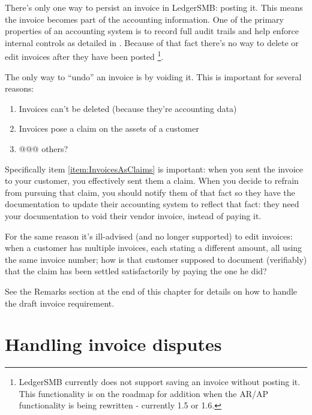 There's only one way to persist an invoice in LedgerSMB: posting it. This means
the invoice becomes part of the accounting information. One of the primary
properties of an accounting system is to record full audit trails and help enforce
internal controls as detailed in . Because
of that fact there's no way to delete or edit invoices after they have been posted
\footnote{LedgerSMB currently does not support saving an invoice without posting
it. This functionality is on the roadmap for addition when the AR/AP functionality
is being rewritten - currently 1.5 or 1.6.}.

The only way to ``undo'' an invoice is by voiding it. This is important for several
reasons:

\begin{enumerate}
\item Invoices can't be deleted (because they're accounting data)
\item Invoices pose a claim on the assets of a customer
\label{item:InvoicesAsClaims}
\item @@@ others?
\end{enumerate}

Specifically item \ref{item:InvoicesAsClaims} is important: when you sent the invoice
to your customer, you effectively sent them a claim. When you decide to refrain from
pursuing that claim, you should notify them of that fact so they have the documentation
to update their accounting system to reflect that fact: they need your documentation
to void their vendor invoice, instead of paying it.

For the same reason it's ill-advised (and no longer supported) to edit invoices:
when a customer has multiple invoices, each stating a different amount, all
using the same invoice number; how is that customer supposed to document (verifiably)
that the claim has been settled satisfactorily by paying the one he did?

See the Remarks section at the end of this chapter for details on how to handle
the draft invoice requirement.

\section{Handling invoice disputes}

